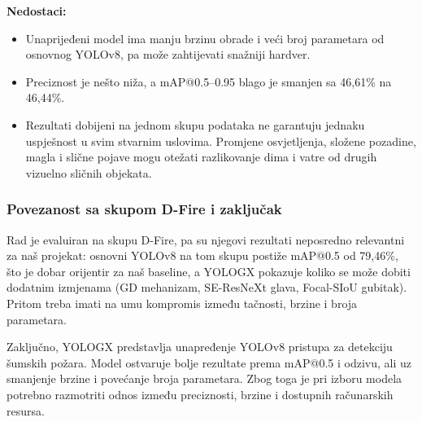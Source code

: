 \textbf{Nedostaci:}
\begin{itemize}
  \item Unaprijeđeni model ima manju brzinu obrade i veći broj parametara od osnovnog YOLOv8, pa može zahtijevati snažniji hardver.
  \item Preciznost je nešto niža, a mAP@0.5--0.95 blago je smanjen sa 46,61\% na 46,44\%.
  \item Rezultati dobijeni na jednom skupu podataka ne garantuju jednaku uspješnost u svim stvarnim uslovima. Promjene osvjetljenja, složene pozadine, magla i slične pojave mogu otežati razlikovanje dima i vatre od drugih vizuelno sličnih objekata.
\end{itemize}

\subsubsection{Povezanost sa skupom D-Fire i zaključak}
Rad je evaluiran na skupu D-Fire, pa su njegovi rezultati neposredno relevantni za naš projekat: osnovni YOLOv8 na tom skupu postiže mAP@0.5 od 79,46\%, što je dobar orijentir za naš baseline, a YOLOGX pokazuje koliko se može dobiti dodatnim izmjenama (GD mehanizam, SE-ResNeXt glava, Focal-SIoU gubitak). Pritom treba imati na umu kompromis između tačnosti, brzine i broja parametara.

Zaključno, YOLOGX predstavlja unapređenje YOLOv8 pristupa za detekciju šumskih požara. Model ostvaruje bolje rezultate prema mAP@0.5 i odzivu, ali uz smanjenje brzine i povećanje broja parametara. Zbog toga je pri izboru modela potrebno razmotriti odnos između preciznosti, brzine i dostupnih računarskih resursa.